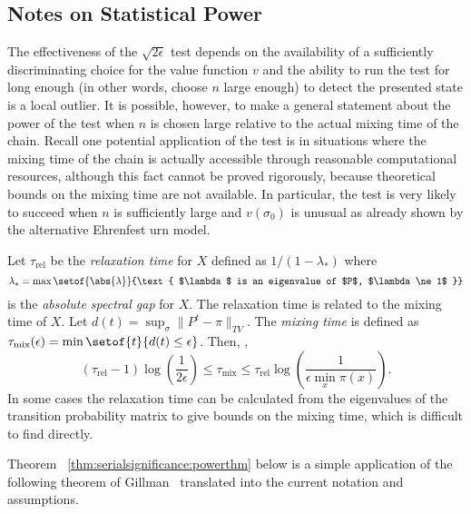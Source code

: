 \documentclass[12pt]{article}
\begin{document}
\subsection*{Notes on Statistical Power}

The effectiveness of the \( \sqrt{2\epsilon} \) test depends on the
availability of a sufficiently discriminating choice for the value
function \( v \) and the ability to run the test for long enough (in
other words, choose \( n \) large enough) to detect the presented state
is a local outlier.  It is possible, however, to make a general
statement about the power of the test when \( n \) is chosen large
relative to the actual mixing time of the chain.  Recall one potential
application of the test is in situations where the mixing time of the
chain is actually accessible through reasonable computational resources,
although this fact cannot be proved rigorously, because theoretical
bounds on the mixing time are not available.  In particular, the test is
very likely to succeed when \( n \) is sufficiently large and \( v(\sigma_0)
\) is unusual as already shown by the alternative Ehrenfest urn model.

\begin{remark}
    Let \( \tau_{\text{rel}} \) be the \emph{relaxation time}%
    for \( X \) defined as \( 1/ (1-\lambda_*) \) where
    \[
        \lambda_* = \max \setof{\abs{\lambda}}{\text{ $\lambda$ is an
        eigenvalue of $P$, $\lambda \ne 1$ }}
    \] is the \emph{absolute spectral gap} for \( X \).  The relaxation
    time is related to the mixing time of \( X \).  Let \( d(t) = \sup_{\sigma}
    \| P^t - \pi \|_{TV} \).  The \emph{mixing time} is defined as \(
    \tau_{\text{mix}}(\epsilon) = \min\setof{t}{d(t) \le \epsilon} \).
    Then,
    \cite[Theorems 12.3, 12.4]{levin09},
    \[
        (\tau_{\text{rel}}-1) \log \left( \frac{1}{2\epsilon} \right)
        \le \tau_{\text{mix}} \le \tau_{\text{rel}} \log \left( \frac{1}
        {\epsilon \min_x \pi(x)} \right).
    \] In some cases the relaxation time can be calculated from the
    eigenvalues of the transition probability matrix to give bounds on
    the mixing time, which is difficult to find directly.
\end{remark}

Theorem~%
\ref{thm:serialsignificance:powerthm} below is a simple application of the
following theorem of Gillman~%
\cite[Theorem 2.1]{gillman98} translated into the current notation and
assumptions.
\end{document}
